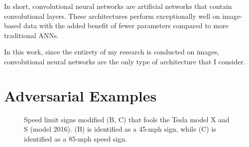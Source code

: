 In short, convolutional neural networks are artificial networks that contain
convolutional layers. These architectures perform exceptionally well on
image-based data with the added benefit of fewer parameters compared to more
traditional ANNs.


In this work, since the entirety of my research is conducted on images,
convolutional neural networks are the only type of architecture that I consider.

\section{Adversarial Examples}
\label{Adversarial_examples}
\begin{figure}[ht]
    \centering
       \caption{Speed limit signs modified (B, C) that fools the Tesla model X
        and S (model 2016). (B) is identified as a 45-mph sign, while (C) is
        identified as a 85-mph speed sign.}
    \label{fig:mcafee_tesla}
\end{figure}

